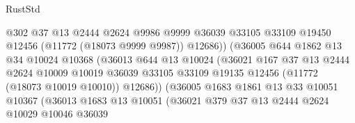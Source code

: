 \begin{lexlean}{RustStd}
\begin{coremodule}
                                    @302
                                    @37
                                    @13
                                    @2444
                                    @2624
                                    @9986
                                    @9999
                                    @36039
                                    @33105
                                    @33109
                                    @19450
                                    @12456
                                    (@11772 (@18073 @9999 @9987))
                                    @12686))
                                (@36005
                                  @644
                                  @1862
                                  @13
                                  @34
                                  @10024
                                  @10368
                                  (@36013
                                    @644
                                    @13
                                    @10024
                                    (@36021
                                      @167
                                      @37
                                      @13
                                      @2444
                                      @2624
                                      @10009
                                      @10019
                                      @36039
                                      @33105
                                      @33109
                                      @19135
                                      @12456
                                      (@11772 (@18073 @10019 @10010))
                                      @12686))
                                  (@36005
                                    @1683
                                    @1861
                                    @13
                                    @33
                                    @10051
                                    @10367
                                    (@36013
                                      @1683
                                      @13
                                      @10051
                                      (@36021
                                        @379
                                        @37
                                        @13
                                        @2444
                                        @2624
                                        @10029
                                        @10046
                                        @36039

\end{coremodule}
\end{lexlean}
